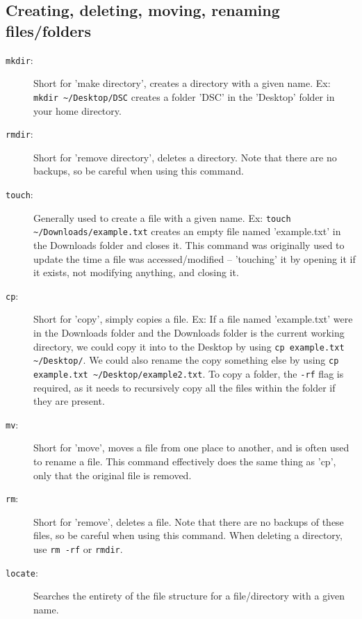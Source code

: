 \documentclass[12pt,a4paper]{article}
\begin{document}
\subsection*{Creating, deleting, moving, renaming files/folders}
\begin{description}
    \item[\texttt{mkdir}:] Short for 'make directory', creates a directory with a given name. Ex: \texttt{mkdir \textasciitilde{}/Desktop/DSC} creates a folder 'DSC' in the 'Desktop' folder in your home directory.
    \item[\texttt{rmdir}:] Short for 'remove directory', deletes a directory. Note that there are no backups, so be careful when using this command.
    \item[\texttt{touch}:] Generally used to create a file with a given name. Ex: \texttt{touch \textasciitilde{}/Downloads/example.txt} creates an empty file named 'example.txt' in the Downloads folder and closes it. This command was originally used to update the time a file was accessed/modified -- 'touching' it by opening it if it exists, not modifying anything, and closing it.
    \item[\texttt{cp}:] Short for 'copy', simply copies a file. Ex: If a file named 'example.txt' were in the Downloads folder and the Downloads folder is the current working directory, we could copy it into to the Desktop by using \texttt{cp example.txt \textasciitilde{}/Desktop/}. We could also rename the copy something else by using \texttt{cp example.txt \textasciitilde{}/Desktop/example2.txt}. To copy a folder, the \texttt{-rf} flag is required, as it needs to recursively copy all the files within the folder if they are present.
    \item[\texttt{mv}:] Short for 'move', moves a file from one place to another, and is often used to rename a file. This command effectively does the same thing as 'cp', only that the original file is removed.
    \item[\texttt{rm}:] Short for 'remove', deletes a file. Note that there are no backups of these files, so be careful when using this command. When deleting a directory, use \texttt{rm -rf} or \texttt{rmdir}.
    \item[\texttt{locate}:] Searches the entirety of the file structure for a file/directory with a given name.
\end{description}
\end{document}
